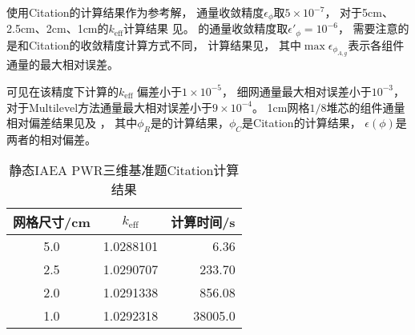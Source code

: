 使用Citation的计算结果作为参考解，
通量收敛精度$\epsilon_\phi$取$5\times10^{-7}$，
对于5cm、2.5cm、2cm、1cm的$k_\mathrm{eff}$计算结果
见。
\ProgramName 的通量收敛精度取$\epsilon'_\phi=10^{-6}$，
需要注意的是\ProgramName 和Citation的收敛精度计算方式不同，
计算结果见，
其中$\max\epsilon_{\phi_{A,g}}$表示各组件通量的最大相对误差。

可见在该精度下\ProgramName 计算的$k_\mathrm{eff}$ 偏差小于$1\times10^{-5}$，
细网通量最大相对误差小于$10^{-3}$，
对于Multilevel方法通量最大相对误差小于$9\times10^{-4}$。
1cm网格$1/8$堆芯的组件通量相对偏差结果见及
，
其中$\phi_R$是\ProgramName 的计算结果，$\phi_C$是Citation的计算结果，
$\epsilon(\phi)$是两者的相对偏差。


\begin{table}
\centering
\caption{静态IAEA PWR三维基准题Citation计算结果}
\label{tab:result.iaea.citation}
\begin{tabular}{ccr}
\toprule
网格尺寸/cm & $k_\mathrm{eff}$ & 计算时间/s \\
\midrule
5.0 & 1.0288101 &    6.36 \\
2.5 & 1.0290707 &  233.70 \\
2.0 & 1.0291338 &  856.08 \\
1.0 & 1.0292318 & 38005.0 \\
\bottomrule
\end{tabular}
\end{table}


